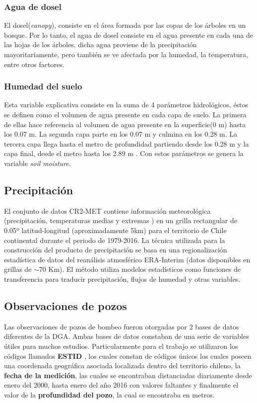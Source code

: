     \subsubsection{Agua de dosel}
    El dosel(\textit{canopy}), consiste en el área formada por las copas de los árboles en un bosque. Por lo tanto, el agua de dosel consiste en el agua presente en cada una de las hojas de los árboles, dicha agua proviene de 
    la precipitación mayoritariamente, pero también se ve afectada por la humedad, la temperatura, entre otros factores.

    \subsubsection{Humedad del suelo}
    Esta variable explicativa consiste en la suma de 4 parámetros hidrológicos, éstos se definen como el volumen de agua presente en cada capa de suelo. La primera de ellas
    hace referencia al volumen de agua presente en la superficie(0 m) hasta los 0.07 m. La segunda capa parte en los 0.07 m y culmina en los 0.28 m. La tercera capa llega hasta el metro de profundidad partiendo desde los 0.28 m
    y la capa final, desde el metro hasta los 2.89 m \cite{ERA5-L_doc}. Con estos parámetros se genera la variable \textit{soil moisture}.

    \subsection{Precipitación}
    El conjunto de datos CR2-MET contiene información meteorológica (precipitación, temperaturas medias y extremas ) en un grilla rectangular de 0.05º latitud-longitud (aproximadamente 5km) para el territorio de Chile continental 
    durante el periodo de 1979-2016. La técnica utilizada para la construcción del producto de precipitación se basa en una regionalización estadística de datos del reanálisis atmosférico ERA-Interim (datos disponibles en grillas de $\sim$70 Km). 
    El método utiliza modelos estadísticos como funciones de transferencia para traducir precipitación, flujos de humedad y otras variables\cite{pr}.
    
    \subsection{Observaciones de pozos}
    Las observaciones de pozos de bombeo fueron otorgadas por 2 bases de datos diferentes de la DGA. Ambas bases de datos constaban de una serie de variables útiles para muchos estudios.
    Particularmente para el trabajo se utilizaron los códigos llamados \textbf{ESTID} \cite{gwl}, los cuales constan de códigos únicos los cuales poseen una coordenada geográfica asociada localizada dentro
    del territorio chileno, la \textbf{fecha de la medición}, las cuales se encontraban distanciadas diariamente desde enero del 2000, hasta enero del año 2016 con valores faltantes y finalmente el valor de la \textbf{profundidad del pozo},
    la cual se encontraba en metros.

